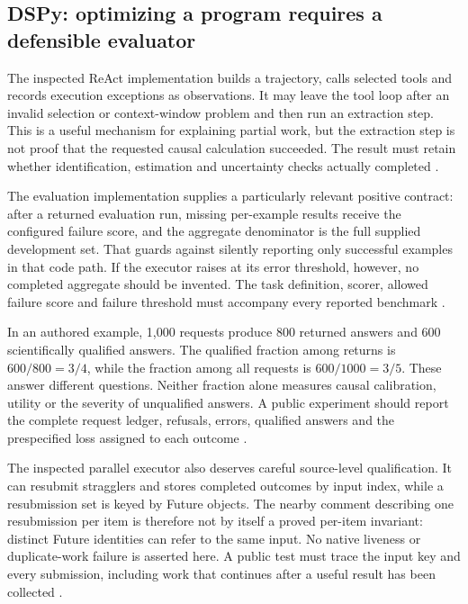 \subsection{DSPy: optimizing a program requires a defensible evaluator}
The inspected ReAct implementation builds a trajectory, calls selected
tools and records execution exceptions as observations. It may leave the
tool loop after an invalid selection or context-window problem and then
run an extraction step. This is a useful mechanism for explaining partial
work, but the extraction step is not proof that the requested causal
calculation succeeded. The result must retain whether identification,
estimation and uncertainty checks actually completed
\citep{exec24_framework_dspy}.

The evaluation implementation supplies a particularly relevant positive
contract: after a returned evaluation run, missing per-example results
receive the configured failure score, and the aggregate denominator is
the full supplied development set. That guards against silently reporting
only successful examples in that code path. If the executor raises at
its error threshold, however, no completed aggregate should be invented.
The task definition, scorer, allowed failure score and failure threshold
must accompany every reported benchmark
\citep{exec24_framework_dspy}.

In an authored example, 1,000 requests produce 800 returned answers and
600 scientifically qualified answers. The qualified fraction among
returns is $600/800=3/4$, while the fraction among all requests is
$600/1000=3/5$. These answer different questions. Neither fraction alone
measures causal calibration, utility or the severity of unqualified
answers. A public experiment should report the complete request ledger,
refusals, errors, qualified answers and the prespecified loss assigned to
each outcome \citep{exec24_framework_contracts}.

The inspected parallel executor also deserves careful source-level
qualification. It can resubmit stragglers and stores completed outcomes
by input index, while a resubmission set is keyed by Future objects.
The nearby comment describing one resubmission per item is therefore not
by itself a proved per-item invariant: distinct Future identities can
refer to the same input. No native liveness or duplicate-work failure is
asserted here. A public test must trace the input key and every submission,
including work that continues after a useful result has been collected
\citep{exec24_framework_dspy,exec24_framework_contracts}.

